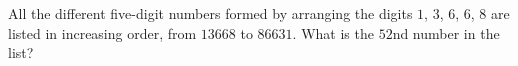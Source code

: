 All the different five-digit numbers formed by arranging the digits $1$, $3$, $6$, $6$, $8$ are listed in increasing order, from $13668$ to $86631$. What is the $52$nd number in the list?
